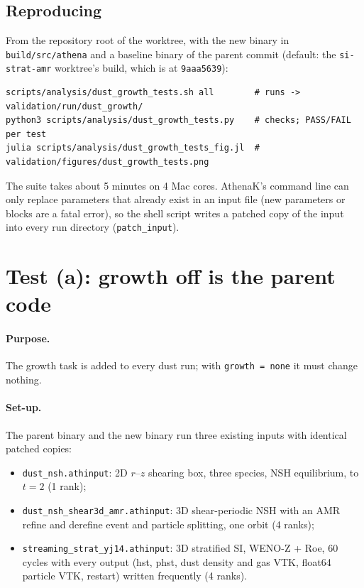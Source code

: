 \documentclass[11pt]{article}
\newcommand{\code}[1]{\texttt{#1}}
\newcommand{\file}[1]{\texttt{\small #1}}
\begin{document}
\subsection{Reproducing}
From the repository root of the worktree, with the new binary in \file{build/src/athena}
and a baseline binary of the parent commit (default: the \code{si-strat-amr} worktree's
build, which is at \code{9aaa5639}):
\begin{lstlisting}
scripts/analysis/dust_growth_tests.sh all        # runs -> validation/run/dust_growth/
python3 scripts/analysis/dust_growth_tests.py    # checks; PASS/FAIL per test
julia scripts/analysis/dust_growth_tests_fig.jl  # validation/figures/dust_growth_tests.png
\end{lstlisting}
The suite takes about 5 minutes on 4 Mac cores. AthenaK's command line can only replace
parameters that already exist in an input file (new parameters or blocks are a fatal
error), so the shell script writes a patched copy of the input into every run directory
(\code{patch\_input}).

\section{Test (a): growth off is the parent code}

\paragraph{Purpose.} The growth task is added to every dust run; with
\code{growth = none} it must change nothing.

\paragraph{Set-up.} The parent binary and the new binary run three existing inputs with
identical patched copies:
\begin{itemize}
\item \file{dust\_nsh.athinput}: 2D $r$--$z$ shearing box, three species, NSH
  equilibrium, to $t=2$ (1 rank);
\item \file{dust\_nsh\_shear3d\_amr.athinput}: 3D shear-periodic NSH with an AMR refine
  and derefine event and particle splitting, one orbit (4 ranks);
\item \file{streaming\_strat\_yj14.athinput}: 3D stratified SI, WENO-Z + Roe,
  60 cycles with every output (hst, phst, dust density and gas VTK, float64 particle VTK,
  restart) written frequently (4 ranks).
\end{itemize}
\end{document}

